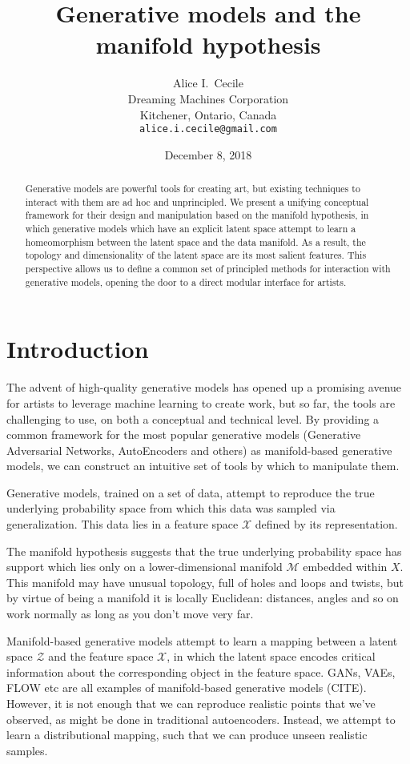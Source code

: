 \documentclass{article}
\title{Generative models and the manifold hypothesis}
\author{Alice I.~Cecile \\
        Dreaming Machines Corporation \\
        Kitchener, Ontario, Canada \\
        \texttt{alice.i.cecile@gmail.com}}
\date{December 8, 2018}
\begin{document}
\maketitle

\begin{abstract}
    Generative models are powerful tools for creating art, but existing techniques to interact with them are ad hoc and unprincipled.
    We present a unifying conceptual framework for their design and manipulation based on the manifold hypothesis, in which generative models which have an explicit latent space attempt to learn a homeomorphism between the latent space and the data manifold.
    As a result, the topology and dimensionality of the latent space are its most salient features.
    This perspective allows us to define a common set of principled methods for interaction with generative models, opening the door to a direct modular interface for artists.
\end{abstract}

\section{Introduction}

The advent of high-quality generative models has opened up a promising avenue for artists to leverage machine learning to create work, but so far, the tools are challenging to use, on both a conceptual and technical level.
By providing a common framework for the most popular generative models (Generative Adversarial Networks, AutoEncoders and others) as manifold-based generative models, we can construct an intuitive set of tools by which to manipulate them.

Generative models, trained on a set of data, attempt to reproduce the true underlying probability space from which this data was sampled via generalization.
This data lies in a feature space $\mathcal{X}$ defined by its representation.

The manifold hypothesis suggests that the true underlying probability space has support which lies only on a lower-dimensional manifold $\mathcal{M}$ embedded within $X$.
This manifold may have unusual topology, full of holes and loops and twists, but by virtue of being a manifold it is locally Euclidean: distances, angles and so on work normally as long as you don't move very far.

Manifold-based generative models attempt to learn a mapping between a latent space $\mathcal{Z}$ and the feature space $\mathcal{X}$, in which the latent space encodes critical information about the corresponding object in the feature space.
GANs, VAEs, FLOW etc are all examples of manifold-based generative models (CITE).
However, it is not enough that we can reproduce realistic points that we've observed, as might be done in traditional autoencoders.
Instead, we attempt to learn a distributional mapping, such that we can produce unseen realistic samples.
\end{document}
